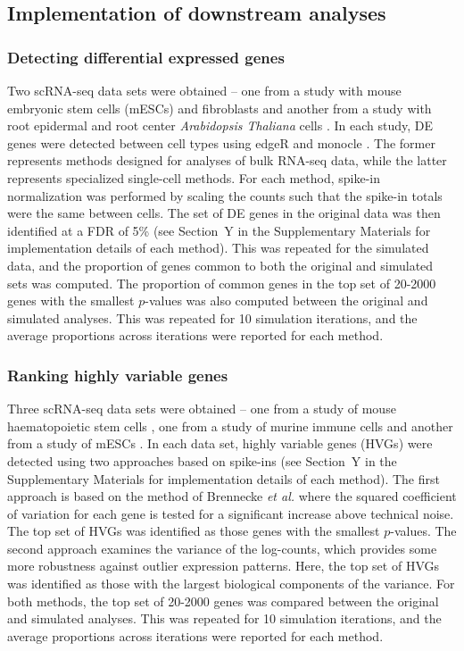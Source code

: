 \documentclass{article}
\begin{document}
\subsection{Implementation of downstream analyses}

\subsubsection{Detecting differential expressed genes}
Two scRNA-seq data sets were obtained -- one from a study with mouse embryonic stem cells (mESCs) and fibroblasts \cite{islam2011characterization} and another from a study with root epidermal and root center \textit{Arabidopsis Thaliana} cells \cite{brennecke2013accounting}.
In each study, DE genes were detected between cell types using edgeR \cite{lund2012detecting} and monocle \cite{trapnell2014dynamics}.
The former represents methods designed for analyses of bulk RNA-seq data, while the latter represents specialized single-cell methods.
For each method, spike-in normalization was performed by scaling the counts such that the spike-in totals were the same between cells.
The set of DE genes in the original data was then identified at a FDR of 5\% (see Section~Y in the Supplementary Materials for implementation details of each method).
This was repeated for the simulated data, and the proportion of genes common to both the original and simulated sets was computed.
The proportion of common genes in the top set of 20-2000 genes with the smallest $p$-values was also computed between the original and simulated analyses.
This was repeated for 10 simulation iterations, and the average proportions across iterations were reported for each method.

\subsubsection{Ranking highly variable genes}
Three scRNA-seq data sets were obtained -- one from a study of mouse haematopoietic stem cells \cite{wilson2015combined}, one from a study of murine immune cells \cite{brennecke2013accounting} and another from a study of mESCs \cite{islam2014quantitative}.
In each data set, highly variable genes (HVGs) were detected using two approaches based on spike-ins (see Section~Y in the Supplementary Materials for implementation details of each method).
The first approach is based on the method of Brennecke \textit{et al.} \cite{brennecke2013accounting} where the squared coefficient of variation for each gene is tested for a significant increase above technical noise.
The top set of HVGs was identified as those genes with the smallest $p$-values.
The second approach examines the variance of the log-counts, which provides some more robustness against outlier expression patterns.
Here, the top set of HVGs was identified as those with the largest biological components of the variance.
For both methods, the top set of 20-2000 genes was compared between the original and simulated analyses.
This was repeated for 10 simulation iterations, and the average proportions across iterations were reported for each method.
\end{document}

